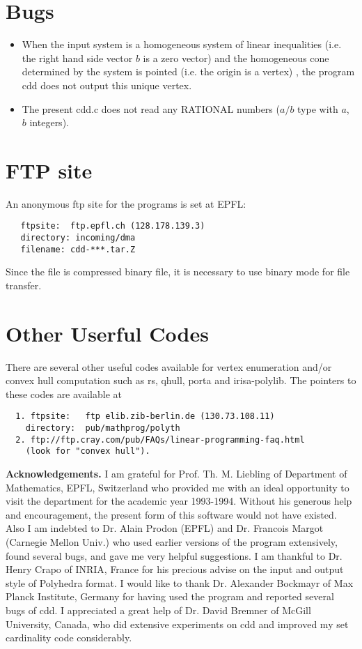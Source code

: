 \section{Bugs}  \label{BUGS}
\begin{itemize}

\item When the input system is a homogeneous system of linear inequalities
(i.e. the right hand side vector $b$ is a zero vector) and the homogeneous
cone determined by the system is pointed (i.e. the origin is a vertex) , 
the program cdd does not output this unique vertex.

\item The present cdd.c does not
read any RATIONAL numbers ($a/b$ type with $a$, $b$ integers).

\end{itemize}

\section{FTP site}  \label{FTP}
An anonymous ftp site for the programs is set at EPFL:
\begin{verbatim}
   ftpsite:  ftp.epfl.ch (128.178.139.3)
   directory: incoming/dma
   filename: cdd-***.tar.Z
\end{verbatim}
Since the file is compressed binary file, it is necessary to use binary mode for
file transfer.

\section{Other Userful Codes}  \label{CODES}
There are several other useful codes available for vertex enumeration and/or
convex hull computation  such as rs, qhull, porta and irisa-polylib.
The pointers to these codes are available at
\begin{verbatim}
  1. ftpsite:   ftp elib.zib-berlin.de (130.73.108.11)      
    directory:  pub/mathprog/polyth
  2. ftp://ftp.cray.com/pub/FAQs/linear-programming-faq.html
    (look for "convex hull").
\end{verbatim}


\bigskip
\noindent
{\large {\bf Acknowledgements.}} 
I am  grateful for Prof. Th. M. Liebling of
Department of Mathematics, EPFL, Switzerland who
provided me with an ideal opportunity to visit the department
for the academic year 1993-1994.  Without his 
generous help and encouragement,
the present form of this software would not have existed.
Also I am indebted to Dr. Alain Prodon (EPFL) and Dr. Francois Margot
(Carnegie Mellon Univ.) who used earlier versions of the program extensively,
found several bugs, and  gave me very helpful suggestions.
I am thankful to Dr. Henry Crapo of INRIA, France for
his precious advise on the input and output style of Polyhedra format.
I would like to thank Dr. Alexander Bockmayr
of Max Planck Institute, Germany for having used the program and
reported several bugs of cdd.  I appreciated a great help of
Dr. David Bremner of McGill University, Canada, who did extensive
experiments on  cdd and improved my set cardinality code
considerably.

